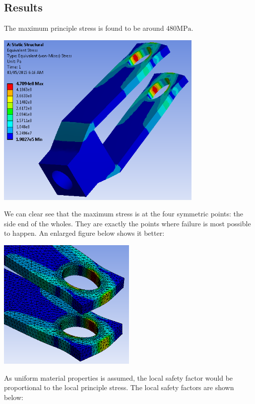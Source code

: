 \documentclass[a4paper,14pt]{extarticle}
\begin{document}
\subsection{Results}
The maximum principle stress is found to be around $480\si{\mega\pascal}$.

\begin{center}\includegraphics[width=0.75\textwidth]{STRESS_DEFAULT.PNG}\end{center}

We can clear see that the maximum stress is at the four symmetric points: the side end of the wholes. They are exactly the points where failure is most possible to happen.  An enlarged figure below shows it better:

\begin{center}\includegraphics[width=0.5\textwidth]{LOCAL_STRESS.PNG}\end{center}

As uniform material properties is assumed, the local safety factor would be proportional to the local principle stress. The local safety factors are shown below:
\end{document}
